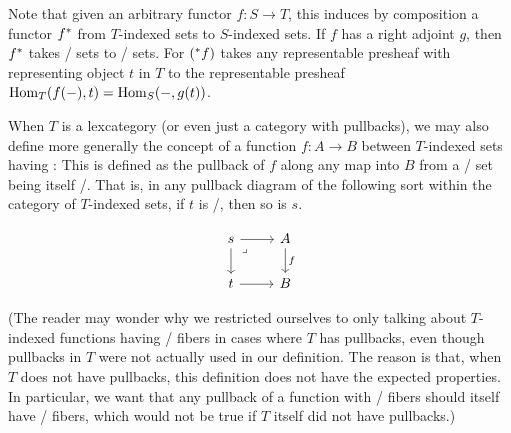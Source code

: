 Note that given an arbitrary functor $f : S \to T$, this induces by composition a functor $f^*$ from $T$-indexed sets to $S$-indexed sets. If $f$ has a right adjoint $g$, then $f^*$ takes \repsmall/ sets to \repsmall/ sets. For $(^*f)$ takes any representable presheaf with representing object $t$ in $T$ to the representable presheaf $\operatorname{Hom}_T(f(-), t) = \operatorname{Hom}_S(-, g(t))$.

When $T$ is a lexcategory (or even just a category with pullbacks), we may also define more generally the concept of a function $f : A \to B$ between $T$-indexed sets having : This is defined as the pullback of $f$ along any map into $B$ from a \repsmall/ set being itself \repsmall/. That is, in any pullback diagram of the following sort within the category of $T$-indexed sets, if $t$ is \repsmall/, then so is $s$.

\[\begin{tikzcd}
	s & A \\
	t & B
	\arrow["f", from=1-2, to=2-2]
	\arrow[from=2-1, to=2-2]
	\arrow[from=1-1, to=2-1]
	\arrow[from=1-1, to=1-2]
	\arrow["\lrcorner"{anchor=center, pos=0.125}, draw=none, from=1-1, to=2-2]
\end{tikzcd}\]

(The reader may wonder why we restricted ourselves to only talking about $T$-indexed functions having \repsmall/ fibers in cases where $T$ has pullbacks, even though pullbacks in $T$ were not actually used in our definition. The reason is that, when $T$ does not have pullbacks, this definition does not have the expected properties. In particular, we want that any pullback of a function with \repsmall/ fibers should itself have \repsmall/ fibers, which would not be true if $T$ itself did not have pullbacks.)

